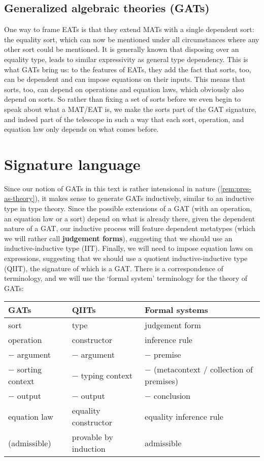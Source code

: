 \documentclass[a4paper]{article}
\begin{document}
\subsection{Generalized algebraic theories (GATs)}
One way to frame EATs is that they extend MATs with a single dependent sort: the equality sort, which can now be mentioned under all circumstances where any other sort could be mentioned.
It is generally known that disposing over an equality type, leads to similar expressivity as general type dependency.
This is what GATs bring us: to the features of EATs, they add the fact that sorts, too, can be dependent and can impose equations on their inputs.
This means that sorts, too, can depend on operations and equation laws, which obviously also depend on sorts.
So rather than fixing a set of sorts before we even begin to speak about what a MAT/EAT is, we make the sorts part of the GAT signature, and indeed part of the telescope in such a way that each sort, operation, and equation law only depends on what comes before.

\section{Signature language} \label{sec:gat:siglang}
Since our notion of GATs in this text is rather intensional in nature (\cref{rem:pres-as-theory}), it makes sense to generate GATs inductively, similar to an inductive type in type theory.
Since the possible extensions of a GAT (with an operation, an equation law or a sort) depend on what is already there, given the dependent nature of a GAT, our inductive process will feature dependent metatypes (which we will rather call \textbf{judgement forms}), suggesting that we should use an inductive-inductive type (IIT).
Finally, we will need to impose equation laws on expressions, suggesting that we should use a quotient inductive-inductive type (QIIT), the signature of which is a GAT.
There is a correspondence of terminology, and we will use the `formal system' terminology for the theory of GATs:
\begin{center}
	\begin{tabular}{l | l | l}
		\textbf{GATs} & \textbf{QIITs} & \textbf{Formal systems} \\ \hline
		sort & type & judgement form \\
		operation & constructor & inference rule \\
		$-$ argument & $-$ argument & $-$ premise \\
		$-$ sorting context & $-$ typing context & $-$ (metacontext / collection of premises) \\
		$-$ output & $-$ output & $-$ conclusion \\
		equation law & equality constructor & equality inference rule \\ \hline
		(admissible) & provable by induction & admissible
	\end{tabular}
\end{center}
\end{document}
